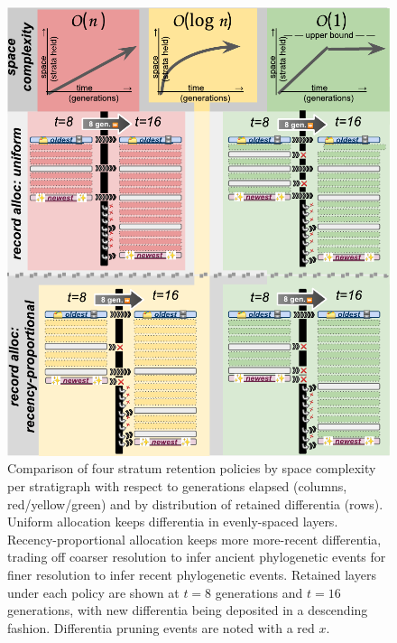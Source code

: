\begin{figure}
  \centering
  \includegraphics[width=\textwidth]{img/retention-policy-matrix}
  \caption{
    Comparison of four stratum retention policies by space complexity per stratigraph with respect to generations elapsed (columns, red/yellow/green) and by distribution of retained differentia (rows).
    Uniform allocation keeps differentia in evenly-spaced layers.
    Recency-proportional allocation keeps more more-recent differentia, trading off coarser resolution to infer ancient phylogenetic events for finer resolution to infer recent phylogenetic events.
    Retained layers under each policy are shown at $t=8$ generations and $t=16$ generations, with new differentia being deposited in a descending fashion.
    Differentia pruning events are noted with a red $x$.
  }
  \label{fig:retention-policy-matrix}
\end{figure}
